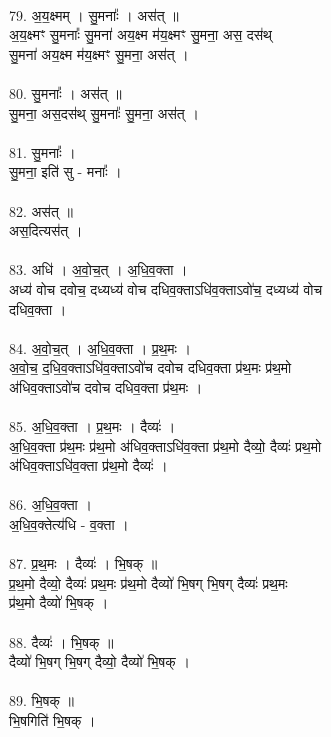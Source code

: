 \\
79. अ॒य॒क्ष्मम् । सु॒मनाः᳚ । अस॑त् ॥\\
अ॒य॒क्ष्मꣳ सु॒मनाः᳚ सु॒मना॑ अय॒क्ष्म म॑य॒क्ष्मꣳ सु॒मना॒ अस॒ दस॑थ्\\
सु॒मना॑ अय॒क्ष्म म॑य॒क्ष्मꣳ सु॒मना॒ अस॑त् ।\\
\\
80. सु॒मनाः᳚ । अस॑त् ॥\\
सु॒मना॒ अस॒दस॑थ् सु॒मनाः᳚ सु॒मना॒ अस॑त् ।\\
\\
81. सु॒मनाः᳚ ।\\
सु॒मना॒ इति॑ सु - मनाः᳚ ।\\
\\
82. अस॑त् ॥\\
अस॒दित्यस॑त् ।\\
\\
83. अधि॑ । अ॒वो॒च॒त् । अ॒धि॒व॒क्ता ।\\
अध्य॑ वोच दवोच॒ दध्यध्य॑ वोच दधिव॒क्ताऽधि॑व॒क्ताऽवो॑च॒ दध्यध्य॑ वोच\\
दधिव॒क्ता ।\\
\\
84. अ॒वो॒च॒त् । अ॒धि॒व॒क्ता । प्र॒थ॒मः ।\\
अ॒वो॒च॒ द॒धि॒व॒क्ताऽधि॑व॒क्ताऽवो॑च दवोच दधिव॒क्ता प्र॑थ॒मः प्र॑थ॒मो\\
अ॑धिव॒क्ताऽवो॑च दवोच दधिव॒क्ता प्र॑थ॒मः ।\\
\\
85. अ॒धि॒व॒क्ता । प्र॒थ॒मः । दैव्यः॑ ।\\
अ॒धि॒व॒क्ता प्र॑थ॒मः प्र॑थ॒मो अ॑धिव॒क्ताऽधि॑व॒क्ता प्र॑थ॒मो दैव्यो॒ दैव्यः॑ प्रथ॒मो\\
अ॑धिव॒क्ताऽधि॑व॒क्ता प्र॑थ॒मो दैव्यः॑ ।\\
\\
86. अ॒धि॒व॒क्ता ।\\
अ॒धि॒व॒क्तेत्य॑धि - व॒क्ता ।\\
\\
87. प्र॒थ॒मः । दैव्यः॑ । भि॒षक् ॥\\
प्र॒थ॒मो दैव्यो॒ दैव्यः॑ प्रथ॒मः प्र॑थ॒मो दैव्यो॑ भि॒षग् भि॒षग् दैव्यः॑ प्रथ॒मः\\
प्र॑थ॒मो दैव्यो॑ भि॒षक् ।\\
\\
88. दैव्यः॑ । भि॒षक् ॥\\
दैव्यो॑ भि॒षग् भि॒षग् दैव्यो॒ दैव्यो॑ भि॒षक् ।\\
\\
89. भि॒षक् ॥\\
भि॒षगिति॑ भि॒षक् ।\\
